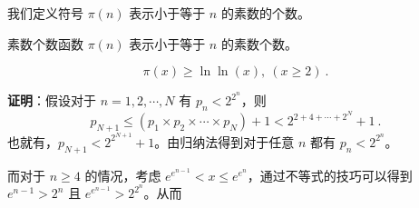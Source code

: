 我们定义符号 $\pi(n)$ 表示小于等于 $n$ 的素数的个数。
\begin{definition}{素数个数函数}
$\pi(n)$ 表示小于等于 $n$ 的素数个数。
\end{definition}

\begin{theorem}{}
\begin{equation}
\pi(x) \ge \ln \ln (x), ~ (x \ge 2) ~.
\end{equation}
\end{theorem}
\textbf{证明}：假设对于 $n = 1, 2, \cdots, N$ 有 $p_n < 2^{2^n}$，则
\begin{equation}
p_{N+1} \leq (p_{1} \times p_2 \times \cdots \times p_N) + 1 < 2^{2+4+\cdots+2^N}+1 ~.
\end{equation}
也就有，$p_{N+1} < 2^{2^{N+1}}+1 $。由归纳法得到对于任意 $n$ 都有 $p_n < 2^{2^n}$。

而对于 $n \ge 4$ 的情况，考虑 $e^{e^{n-1}} <x \le e^{e^n}$，通过不等式的技巧可以得到 $e^{n-1} > 2^n$ 且 $e^{e^{n-1}} > 2^{2^n}$。从而 $ $
